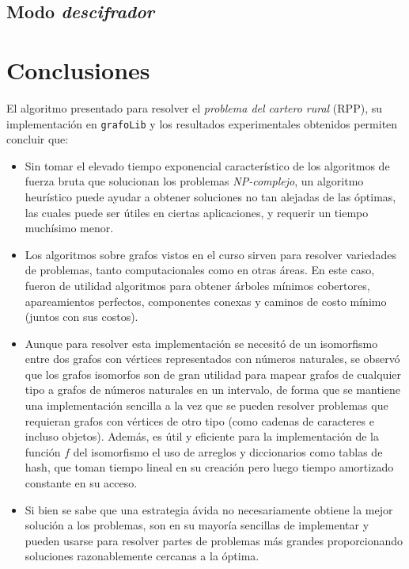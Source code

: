 \documentclass[11pt]{article}
\begin{document}
\subsection{Modo \emph{descifrador}}

\section{Conclusiones}

El algoritmo presentado para resolver el \emph{problema del cartero rural} (RPP),
su implementación en \texttt{grafoLib} y los resultados 
experimentales obtenidos permiten concluir que:

\begin{itemize}
   \item Sin tomar el elevado tiempo exponencial característico de
   los algoritmos de fuerza bruta que solucionan los problemas
   \emph{NP-complejo}, un algoritmo heurístico puede ayudar a obtener
   soluciones no tan alejadas de las óptimas, las cuales puede ser
   útiles en ciertas aplicaciones, y requerir un tiempo muchísimo
   menor.

   \item Los algoritmos sobre grafos vistos en el curso sirven
   para resolver variedades de problemas, tanto computacionales
   como en otras áreas. En este caso, fueron de utilidad algoritmos
   para obtener árboles mínimos cobertores, apareamientos perfectos,
   componentes conexas y caminos de costo mínimo (juntos con sus
   costos).

   \item Aunque para resolver esta implementación se necesitó de 
   un isomorfismo entre dos grafos con vértices representados con 
   números naturales, se observó que los grafos isomorfos son de
   gran utilidad para mapear grafos de cualquier tipo a grafos de
   números naturales en un intervalo, de forma que se mantiene una
   implementación sencilla a la vez que se pueden resolver problemas
   que requieran grafos con vértices de otro tipo (como cadenas de
   caracteres e incluso objetos). Además, es útil y eficiente para
   la implementación de la función $f$ del isomorfismo el uso de arreglos
   y diccionarios como tablas de hash, que toman tiempo lineal en su
   creación pero luego tiempo amortizado constante en su acceso.

   \item Si bien se sabe que una estrategia ávida no necesariamente
   obtiene la mejor solución a los problemas, son en su mayoría
   sencillas de implementar y pueden usarse para resolver partes
   de problemas más grandes proporcionando soluciones razonablemente
   cercanas a la óptima.


\end{itemize}
\end{document}
